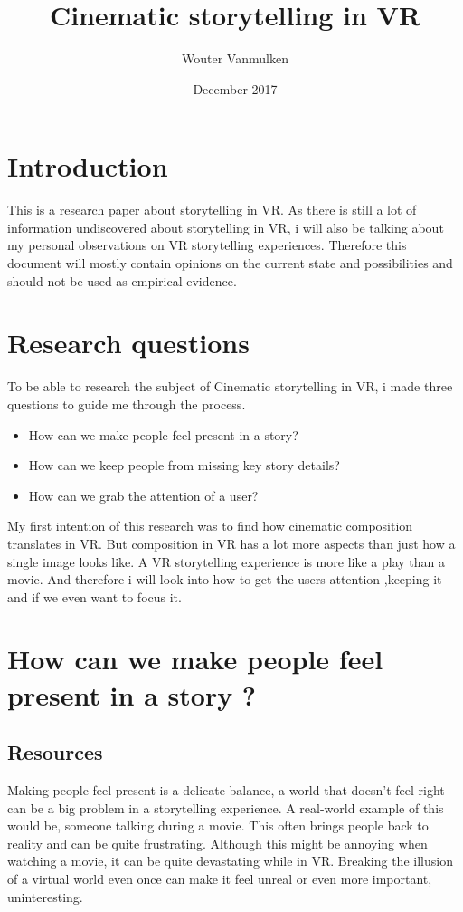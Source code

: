 \documentclass{report}
\title{Cinematic storytelling in VR}
\author{Wouter Vanmulken}
\date{December 2017}
\begin{document}
				\maketitle
				\tableofcontents
				\newpage
		
				\chapter{Introduction}
				
				This is a research paper about storytelling in VR. As there is still a lot of information undiscovered about storytelling in VR, i will also be talking about my personal observations on VR storytelling experiences. Therefore this document will mostly contain opinions on the current state and possibilities and should not be used as empirical evidence.
				
				\chapter{Research questions}
		
				To be able to research the subject of Cinematic storytelling in VR, i made three questions to guide me through the process.
				\begin{itemize}
					\item How can we make people feel present in a story?
					\item How can we keep people from missing key story details?
					\item How can we grab the attention of a user?
				\end{itemize}

				My first intention of this research was to find how cinematic composition translates in VR. But composition in VR has a lot more aspects than just how a single image looks like. A VR storytelling experience is more like a play than a movie. And therefore i will look into how to get the users attention ,keeping it and if we even want to focus it.
				

				
				\chapter{How can we make people feel present in a story ?}
				
				\section{Resources}				
				Making people feel present is a delicate balance, a world that doesn't feel right can be a big problem in a storytelling experience. A real-world example of this would be, someone talking during a movie. This often brings people back to reality and can be quite frustrating. Although this might be annoying when watching a movie, it can be quite devastating while in VR. Breaking the illusion of a virtual world even once can make it feel unreal or even more important, uninteresting.
\end{document}
